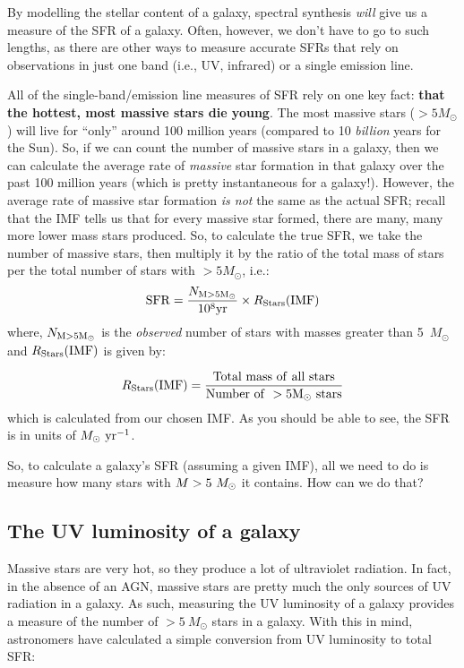 \documentclass[11pt]{article}
\begin{document}
By modelling the stellar content of a galaxy, spectral synthesis {\it
  will} give us a measure of the SFR of a galaxy. Often, however, we
don't have to go to such lengths, as there are other ways to measure
accurate SFRs that rely on observations in just one band (i.e., UV,
infrared) or a single emission line.

All of the single-band/emission line measures of SFR rely on one key
fact: {\bf that the hottest, most massive stars die young}. The most
massive stars ($>5M_\odot$) will live for ``only'' around 100 million
years (compared to 10 {\it billion} years for the Sun). So, if we can
count the number of massive stars in a galaxy, then we can calculate
the average rate of {\it massive} star formation in that galaxy over
the past 100 million years (which is pretty instantaneous for a
galaxy!). However, the average rate of massive star formation {\it is
  not} the same as the actual SFR; recall that the IMF tells us that
for every massive star formed, there are many, many more lower mass
stars produced. So, to calculate the true SFR, we take the number of
massive stars, then multiply it by the ratio of the total mass of
stars per the total number of stars with $>5M_\odot$, i.e.:
\begin{equation}
\label{sfreqn}
{\rm SFR} = \frac{N_{\rm M>5M_\odot}}{\rm 10^8 yr}\times R_{\rm
  Stars}({\rm IMF})
\end{equation}
where, $N_{\rm M>5M_\odot}$ is the {\it observed} number of stars with
masses greater than 5~$M_\odot$ and $R_{\rm Stars}({\rm IMF})$ is
given by:

\begin{equation}
\label{reqn}
R_{\rm Stars}(\rm IMF) = \frac{\rm Total~mass~of~all~stars}{\rm Number~of~>5M_\odot~stars}
\end{equation}
which is calculated from our chosen IMF. As you should be able to see,
the SFR is in units of $M_\odot~{\rm yr^{-1}}$. 

So, to calculate a galaxy's SFR (assuming a given IMF), all we need to
do is measure how many stars with $M>5~M_{\rm \odot}$ it contains. How
can we do that?

\subsection{The UV luminosity of a galaxy}
Massive stars are very hot, so they produce a lot of ultraviolet
radiation. In fact, in the absence of an AGN, massive stars are pretty
much the only sources of UV radiation in a galaxy. As such, measuring
the UV luminosity of a galaxy provides a measure of the number of
$>5~M_\odot$ stars in a galaxy. With this in mind, astronomers have
calculated a simple conversion from UV luminosity to total SFR:
\end{document}
